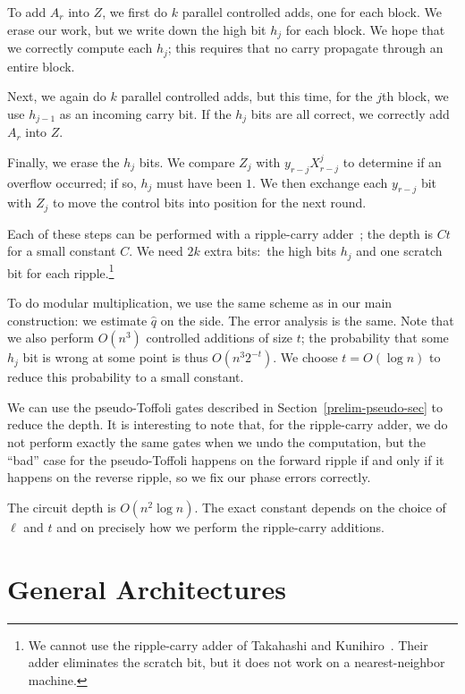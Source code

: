 \documentclass{article} %
\newcommand{\CDKM}{ripple}
\begin{document}
To add $A_r$ into $Z$, we first do $k$ parallel controlled adds, one
for each block.  We erase our work, but we write down the high bit
$h_j$ for each block.  We hope that we correctly compute each $h_j$;
this requires that no carry propagate through an entire block.

Next, we again do $k$ parallel controlled adds, but this time, for
the $j$th block, we use $h_{j-1}$ as an incoming carry bit.  If
the $h_j$ bits are all correct, we correctly add $A_r$ into $Z$.

Finally, we erase the $h_j$ bits.  We compare $Z_j$ with
$y_{r-j} X_{r-j}^j$ to determine if an overflow occurred; if so,
$h_j$ must have been $1$.  We then exchange each $y_{r-j}$ bit with
$Z_j$ to move the control bits into position for the next round.

Each of these steps can be performed with a ripple-carry
adder~\cite{\CDKM}; the depth is $Ct$ for a small constant $C$.  We need $2k$
extra bits:\ the high bits $h_j$ and one scratch bit for each
ripple.\footnote{We cannot use the ripple-carry adder of Takahashi
and Kunihiro~\cite{TK}.  Their adder eliminates the scratch bit,
but it does not work on a nearest-neighbor machine.}

To do modular multiplication, we use the same scheme as in our
main construction: we estimate $\hat{q}$ on the side.  The error
analysis is the same.  Note that we also perform $O(n^3)$
controlled additions of size $t$;
the probability that some $h_j$ bit is wrong at
some point is thus $O(n^3 2^{-t})$.  We choose $t = O(\log n)$ to
reduce this probability to a small constant.

We can use the pseudo-Toffoli
gates described in Section~\ref{prelim-pseudo-sec} to reduce the
depth.  It is interesting to note that, for the ripple-carry adder,
we do not perform exactly the same gates when we undo the computation,
but the ``bad'' case for the pseudo-Toffoli happens on the forward
ripple if and only if it happens on the reverse ripple, so we fix
our phase errors correctly.

The circuit depth is $O(n^2 \log n)$.  The exact constant depends
on the choice of $\ell$ and $t$ and on precisely how we
perform the ripple-carry additions.

\section{General Architectures}
\label{general-sec}
\end{document}
